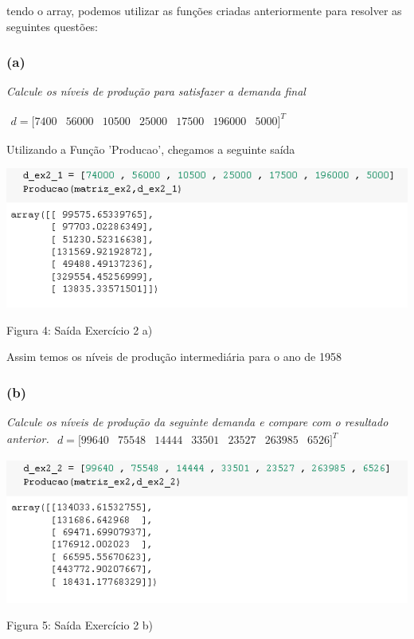 \documentclass[a4paper, 12pt]{article}
\begin{document}
 tendo o array, podemos utilizar as funções criadas anteriormente para resolver as seguintes questões:
 
 \subsubsection{(a)}
 \textit{Calcule os níveis de produção para satisfazer a demanda final}
 
 $\begin{matrix}
 d = [7400 & 56000 & 10500 &   25000 &   17500 &    196000 &   5000]^T
 \end{matrix}$
 
 Utilizando a Função 'Producao', chegamos a seguinte saída
 
 \begin{center}
    \includegraphics{saida2a.PNG}
    
    Figura 4: Saída Exercício 2 a)
    
\end{center}
 
 Assim temos os níveis de produção intermediária para o ano de 1958
 
 \subsubsection{(b)}
 \textit{Calcule os níveis de produção da seguinte demanda e compare com o resultado anterior.}
  $\begin{matrix}
 d = [99640 & 75548 &  14444 &  33501 & 23527 & 263985 & 6526]^T
 \end{matrix}$
 
 \begin{center}
    \includegraphics{saida2b.PNG}
    
    Figura 5: Saída Exercício 2 b)
    
\end{center}
\end{document}
